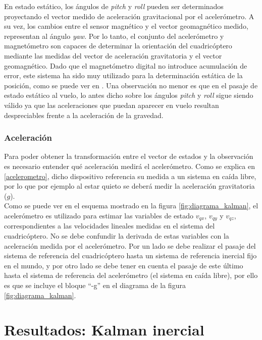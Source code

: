 \documentclass[main]{subfiles}
\begin{document}
En estado estático, los ángulos de \emph{pitch} y \emph{roll} pueden ser determinados proyectando el vector medido de aceleración gravitacional por el acelerómetro. A su vez, los cambios entre el sensor magnético y el vector geomagnético medido, representan al ángulo \emph{yaw}. Por lo tanto, el conjunto del acelerómetro y magnetómetro son capaces de determinar la orientación del cuadricóptero mediante las medidas del vector de aceleración gravitatoria y el vector geomagnético. Dado que el magnetómetro digital no introduce acumulación de error, este sistema ha sido muy utilizado para la determinación estática de la posición, como se puede ver en \cite{bib:euler_magneto_acc}. Una observación no menor es que en el pasaje de estado estático al vuelo, lo antes dicho sobre los ángulos \emph{pitch} y \emph{roll} sigue siendo válido ya que las aceleraciones que puedan aparecer en vuelo resultan despreciables frente a la aceleración de la gravedad.

\subsubsection{Aceleración}

Para poder obtener la transformación entre el vector de estados y la observación es necesario entender qué aceleración medirá el acelerómetro. Como se explica en \ref{acelerometro}, dicho dispositivo referencia su medida a un sistema en caída libre, por lo que por ejemplo al estar quieto se deberá medir la aceleración gravitatoria ($g$).\\
Como se puede ver en el esquema mostrado en la figura \ref{fig:diagrama_kalman}, el acelerómetro es utilizado para estimar las variables de estado $v_{qx}$, $v_{qy}$ y $v_{qz}$, correspondientes a las velocidades lineales medidas en el sistema del cuadricóptero. No se debe confundir la derivada de estas variables con la aceleración medida por el acelerómetro. Por un lado se debe realizar el pasaje del sistema de referencia del cuadricóptero hasta un sistema de referencia inercial fijo en el mundo, y por otro lado se debe tener en cuenta el pasaje de este último hasta el sistema de referencia del acelerómetro (el sistema en caída libre), por ello es que se incluye el bloque ``-g'' en el diagrama de la figura \ref{fig:diagrama_kalman}.



\section{Resultados: Kalman inercial}
\end{document}
